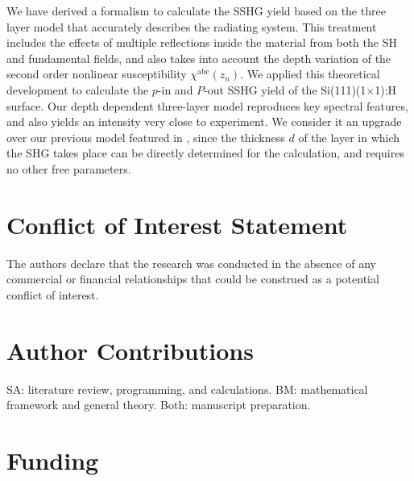 \documentclass[utf8]{frontiersSCNS}
\begin{document}
We have derived a formalism to calculate the SSHG yield based on the three layer
model that accurately describes the radiating system. This treatment includes
the effects of multiple reflections inside the material from both the SH and
fundamental fields, and also takes into account the depth variation of the
second order nonlinear susceptibility $\chi^{\mathrm{abc}}(z_{n})$. We applied
this theoretical development to calculate the $p$-in and $P$-out SSHG yield of
the Si(111)(1$\times$1):H surface. Our depth dependent three-layer model
reproduces key spectral features, and also yields an intensity very close to
experiment. We consider it an upgrade over our previous model featured in
\cite{andersonPRB16b}, since the thickness $d$ of the layer in which the SHG
takes place can be directly determined for the calculation, and requires no
other free parameters.



\section*{Conflict of Interest Statement}

The authors declare that the research was conducted in the absence of any
commercial or financial relationships that could be construed as a potential
conflict of interest.



\section*{Author Contributions}

SA: literature review, programming, and calculations. BM: mathematical framework
and general theory. Both: manuscript preparation.




\section*{Funding}
\end{document}
